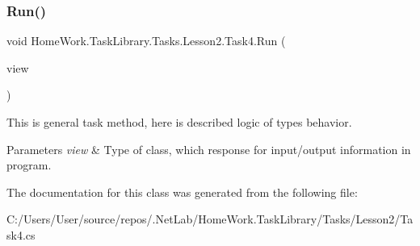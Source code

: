 \subsubsection{\texorpdfstring{Run()}{Run()}}
{\footnotesize\ttfamily void Home\+Work.\+Task\+Library.\+Tasks.\+Lesson2.\+Task4.\+Run (\begin{DoxyParamCaption}\item[{I\+Information}]{view }\end{DoxyParamCaption})}



This is general task method, here is described logic of types behavior. 


\begin{DoxyParams}{Parameters}
{\em view} & Type of class, which response for input/output information in program.\\
\hline
\end{DoxyParams}


The documentation for this class was generated from the following file\+:\begin{DoxyCompactItemize}
\item 
C\+:/\+Users/\+User/source/repos/.\+Net\+Lab/\+Home\+Work.\+Task\+Library/\+Tasks/\+Lesson2/Task4.\+cs\end{DoxyCompactItemize}
